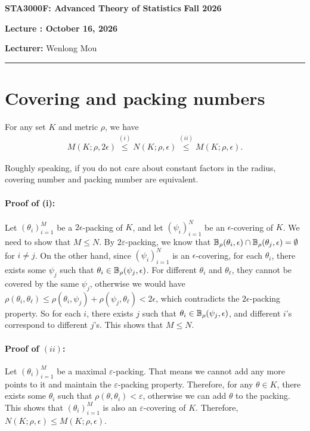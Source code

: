 \documentclass[11pt,letterpaper]{article}
\newcommand{\coursenumber}{STA3000F}
\newcommand{\coursetitle}{Advanced Theory of Statistics}
\newcommand{\courseterm}{Fall 2026}
\newcounter{lecture}
\newcommand{\lecturenumber}{\arabic{lecture}}
\newcommand{\lecturedate}{October 16, 2026}
\newcommand{\lecturer}{Wenlong Mou}
\numberwithin{theorem}{lecture}
\numberwithin{proposition}{lecture}
\numberwithin{lemma}{lecture}
\numberwithin{claim}{lecture}
\numberwithin{corollary}{lecture}
\numberwithin{definition}{lecture}
\numberwithin{conjecture}{lecture}
\numberwithin{remark}{lecture}
\numberwithin{example}{lecture}
\numberwithin{equation}{lecture}
\newcommand{\makelecturenotesheader}{%
  \noindent
  \textbf{\coursenumber: \coursetitle}%
  \hfill
  \textbf{\courseterm}

  \begin{center}
    {\Large\bfseries Lecture \lecturenumber: \lecturedate}
  \end{center}

  \noindent
  \textbf{Lecturer:} \lecturer
  \par\medskip
  \hrule
  \bigskip
}
\begin{document}
\makelecturenotesheader

\section{Covering and packing numbers}
\begin{lemma}[duality]
  For any set $K$ and metric $\rho$, we have
  \begin{align*}
    M (K; \rho, 2 \epsilon) \overset{(i)}{\leq} N (K; \rho, \epsilon) \overset{(ii)}{\leq} M (K; \rho, \epsilon).
  \end{align*}
\end{lemma}
Roughly speaking, if you do not care about constant factors in the radius, covering number and packing number are equivalent.

\paragraph{Proof of (i):} Let $(\theta_i)_{i = 1}^M$ be a $2 \epsilon$-packing of $K$, and let $(\psi_i)_{i = 1}^N$ be an $\epsilon$-covering of $K$. We need to show that $M \leq N$. By $2\varepsilon$-packing, we know that $\mathbb{B}_\rho (\theta_i, \epsilon) \cap \mathbb{B}_\rho (\theta_j, \epsilon) = \emptyset$ for $i \neq j$. On the other hand, since $(\psi_i)_{i = 1}^N$ is an $\epsilon$-covering, for each $\theta_i$, there exists some $\psi_j$ such that $\theta_i \in \mathbb{B}_\rho (\psi_j, \epsilon)$. For different $\theta_i$ and $\theta_\ell$, they cannot be covered by the same $\psi_j$, otherwise we would have $\rho(\theta_i, \theta_\ell) \leq \rho(\theta_i, \psi_j) + \rho(\psi_j, \theta_\ell) < 2 \epsilon$, which contradicts the $2\epsilon$-packing property. So for each $i$, there exists $j$ such that $\theta_i \in \mathbb{B}_\rho (\psi_j, \epsilon)$, and different $i$'s correspond to different $j$'s. This shows that $M \leq N$.

\paragraph{Proof of $(ii)$:} Let $(\theta_i)_{i = 1}^M$ be a maximal $\varepsilon$-packing. That means we cannot add any more points to it and maintain the $\varepsilon$-packing property. Therefore, for any $\theta \in K$, there exists some $\theta_i$ such that $\rho(\theta, \theta_i) < \varepsilon$, otherwise we can add $\theta$ to the packing. This shows that $(\theta_i)_{i = 1}^M$ is also an $\varepsilon$-covering of $K$. Therefore, $N (K; \rho, \epsilon) \leq M (K; \rho, \epsilon)$.
\end{document}

